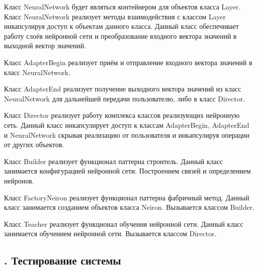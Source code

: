 {\par \redline Класс NeuralNetwork будет являться контейнером для объектов класса Layer. Класс NeuralNetwork реализует методы взаимодействия с классом Layer инкапсулируя доступ к объектам данного класса. Данный класс обеспечивает работу слоёв нейронной сети и преобразование входного вектора значений в выходной вектор значений. 

\par \redline Класс AdapterBegin реализует приём и отправление входного вектора значений в класс NeuralNetwork.  

\par \redline  Класс AdapterEnd реализует получение выходного вектора значений из класс NeuralNetwork для дальнейшей передачи пользователю, либо в класс Director.

\par \redline  Класс Director реализует работу комплекса классов реализующих нейронную сеть. Данный класс инкапсулирует доступ к классам AdapterBegin, AdapterEnd и NeuralNetwork скрывая реализацию от пользователя и инкапсулируя операции от других объектов. 

\par \redline  Класс Builder реализует функционал паттерна строитель. Данный класс занимается конфигурацией нейронной сети. Построением связей и определением нейронов.

\par \redline  Класс FactoryNeiron реализует функционал паттерна фабричный метод. Данный класс занимается созданием объектов класса Neiron. Вызывается классом Builder.

\par \redline  Класс Teacher реализует функционал обучения нейронной сети. Данный класс занимается обучением нейронной сети. Вызывается классом Director.

\par


}


\subtitlespace

\subsection*{
	\gostTitleFont
	\redline
	\thechaptercntr .\thesubchaptercntr \spc
	Тестирование системы 
} \addtocounter{subchaptercntr}{1}

\subtitlespace

